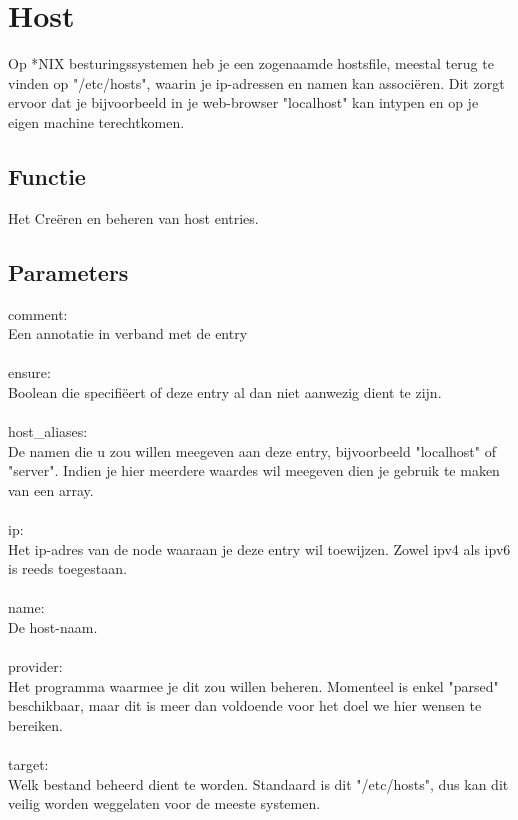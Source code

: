 \section{Host}
Op *NIX besturingssystemen heb je een zogenaamde hostsfile, meestal terug te vinden op "/etc/hosts", waarin je ip-adressen en namen kan associ\"{e}ren. Dit zorgt ervoor dat je bijvoorbeeld in je web-browser "localhost" kan intypen en op je eigen machine terechtkomen.

\subsection{Functie}
Het Cre\"{e}ren en beheren van host entries.

\subsection{Parameters}
comment:\\
Een annotatie in verband met de entry\\\\
%
ensure:\\
Boolean die specifi\"{e}ert of deze entry al dan niet aanwezig dient te zijn.\\\\
%
host\_aliases:\\
De namen die u zou willen meegeven aan deze entry, bijvoorbeeld "localhost" of "server". Indien je hier meerdere waardes wil meegeven dien je gebruik te maken van een array.\\\\
%
ip:\\
Het ip-adres van de node waaraan je deze entry wil toewijzen. Zowel ipv4 als ipv6 is reeds toegestaan.\\\\
%
name:\\
De host-naam.\\\\
%
provider:\\
Het programma waarmee je dit zou willen beheren. Momenteel is enkel "parsed" beschikbaar, maar dit is meer dan voldoende voor het doel we hier wensen te bereiken.\\\\
%
target:\\
Welk bestand beheerd dient te worden. Standaard is dit "/etc/hosts", dus kan dit veilig worden weggelaten voor de meeste systemen.\\\\
